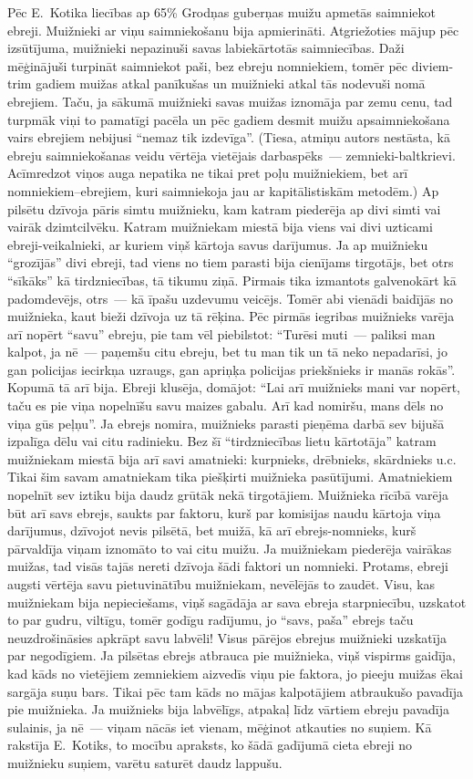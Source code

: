 \documentclass[twoside,a5paper,12pt,fleqn,openany]{extbook}
\begin{document}
Pēc E.~Kotika liecības ap 65\% Grodņas guberņas muižu apmetās saimniekot ebreji. Muižnieki ar viņu saimniekošanu bija apmierināti. Atgriežoties mājup pēc izsūtījuma, muižnieki nepazinuši savas labiekārtotās saimniecības. Daži mēģinājuši turpināt saimniekot paši, bez ebreju nomniekiem, tomēr pēc diviem-trim gadiem muižas atkal panīkušas un muižnieki atkal tās nodevuši nomā ebrejiem. Taču, ja sākumā muižnieki savas muižas iznomāja par zemu cenu, tad turpmāk viņi to pamatīgi pacēla un pēc gadiem desmit muižu apsaimniekošana vairs ebrejiem nebijusi ``nemaz tik izdevīga''. (Tiesa, atmiņu autors nestāsta, kā ebreju saimniekošanas veidu vērtēja vietējais darbaspēks~--- zemnieki-baltkrievi. Acīmredzot viņos auga nepatika ne tikai pret poļu muižniekiem, bet arī nomniekiem--ebrejiem, kuri saimniekoja jau ar kapitālistiskām metodēm.) Ap pilsētu dzīvoja pāris simtu muižnieku, kam katram piederēja ap divi simti vai vairāk dzimtcilvēku. Katram muižniekam miestā bija viens vai divi uzticami ebreji-veikalnieki, ar kuriem viņš kārtoja savus darījumus. Ja ap muižnieku ``grozījās'' divi ebreji, tad viens no tiem parasti bija cienījams tirgotājs, bet otrs ``sīkāks'' kā tirdzniecības, tā tikumu ziņā. Pirmais tika izmantots galvenokārt kā padomdevējs, otrs~--- kā īpašu uzdevumu veicējs. Tomēr abi vienādi baidījās no muižnieka, kaut bieži dzīvoja uz tā rēķina. Pēc pirmās iegribas muižnieks varēja arī nopērt ``savu'' ebreju, pie tam vēl piebilstot: ``Turēsi muti~--- paliksi man kalpot, ja nē~--- paņemšu citu ebreju, bet tu man tik un tā neko nepadarīsi, jo gan policijas iecirkņa uzraugs, gan apriņķa policijas priekšnieks ir manās rokās''. Kopumā tā arī bija. Ebreji klusēja, domājot: ``Lai arī muižnieks mani var nopērt, taču es pie viņa nopelnīšu savu maizes gabalu. Arī kad nomiršu, mans dēls no viņa gūs peļņu''. Ja ebrejs nomira, muižnieks parasti pieņēma darbā sev bijušā izpalīga dēlu vai citu radinieku. Bez šī ``tirdzniecības lietu kārtotāja'' katram muižniekam miestā bija arī savi amatnieki: kurpnieks, drēbnieks, skārdnieks u.c. Tikai šim savam amatniekam tika piešķirti muižnieka pasūtījumi. Amatniekiem nopelnīt sev iztiku bija daudz grūtāk nekā tirgotājiem. Muižnieka rīcībā varēja būt arī savs ebrejs, saukts par faktoru, kurš par komisijas naudu kārtoja viņa darījumus, dzīvojot nevis pilsētā, bet muižā, kā arī ebrejs-nomnieks, kurš pārvaldīja viņam iznomāto to vai citu muižu. Ja muižniekam piederēja vairākas muižas, tad visās tajās nereti dzīvoja šādi faktori un nomnieki. Protams, ebreji augsti vērtēja savu pietuvinātību muižniekam, nevēlējās to zaudēt. Visu, kas muižniekam bija nepieciešams, viņš sagādāja ar sava ebreja starpniecību, uzskatot to par gudru, viltīgu, tomēr godīgu radījumu, jo ``savs, paša'' ebrejs taču neuzdrošināsies apkrāpt savu labvēli! Visus pārējos ebrejus muižnieki uzskatīja par negodīgiem. Ja pilsētas ebrejs atbrauca pie muižnieka, viņš vispirms gaidīja, kad kāds no vietējiem zemniekiem aizvedīs viņu pie faktora, jo pieeju muižas ēkai sargāja suņu bars. Tikai pēc tam kāds no mājas kalpotājiem atbraukušo pavadīja pie muižnieka. Ja muižnieks bija labvēlīgs, atpakaļ līdz vārtiem ebreju pavadīja sulainis, ja nē~--- viņam nācās iet vienam, mēģinot atkauties no suņiem. Kā rakstīja E.~Kotiks, to mocību apraksts, ko šādā gadījumā cieta ebreji no muižnieku suņiem, varētu saturēt daudz lappušu.
\end{document}
